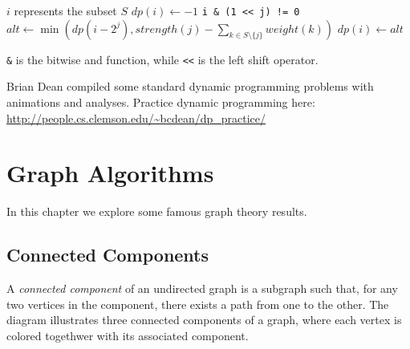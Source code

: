 \documentclass[11pt]{book}
\begin{document}
\begin{algorithmic}
	\Comment $i$ represents the subset $S$
	\State $dp(i) \gets -1$
		\Comment \texttt{i \& (1 << j) != 0}
		\State $alt \gets \min(dp(i-2^j), strength(j) - \sum_{k \in S \setminus \{j\}} weight(k))$
			\State $dp(i) \gets alt$
		\EndIf
	\EndFor
\EndFor
\end{algorithmic}

\texttt{\&} is the bitwise and function, while \texttt{<<} is the left shift operator.

Brian Dean compiled some standard dynamic programming problems with animations and analyses. Practice dynamic programming here: \url{http://people.cs.clemson.edu/~bcdean/dp_practice/}

\chapter{Graph Algorithms}

In this chapter we explore some famous graph theory results.

\section{Connected Components}

A \textit{connected component} of an undirected graph is a subgraph such that, for any two vertices in the component, there exists a path from one to the other. The diagram illustrates three connected components of a graph, where each vertex is colored togethwer with its associated component.

\begin{center}
\end{center}
\end{document}
